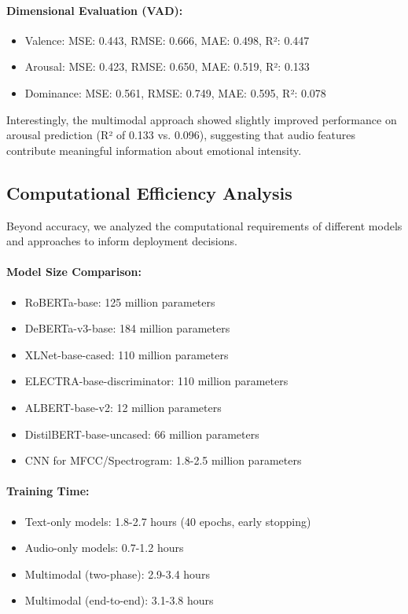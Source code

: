 \documentclass[12pt]{article}
\begin{document}
\paragraph{Dimensional Evaluation (VAD):}
\begin{itemize}
    \item Valence: MSE: 0.443, RMSE: 0.666, MAE: 0.498, R²: 0.447
    \item Arousal: MSE: 0.423, RMSE: 0.650, MAE: 0.519, R²: 0.133
    \item Dominance: MSE: 0.561, RMSE: 0.749, MAE: 0.595, R²: 0.078
\end{itemize}

Interestingly, the multimodal approach showed slightly improved performance on arousal prediction (R² of 0.133 vs. 0.096), suggesting that audio features contribute meaningful information about emotional intensity.

\subsection{Computational Efficiency Analysis}
Beyond accuracy, we analyzed the computational requirements of different models and approaches to inform deployment decisions.

\paragraph{Model Size Comparison:}
\begin{itemize}
    \item RoBERTa-base: 125 million parameters
    \item DeBERTa-v3-base: 184 million parameters
    \item XLNet-base-cased: 110 million parameters
    \item ELECTRA-base-discriminator: 110 million parameters
    \item ALBERT-base-v2: 12 million parameters
    \item DistilBERT-base-uncased: 66 million parameters
    \item CNN for MFCC/Spectrogram: 1.8-2.5 million parameters
\end{itemize}

\paragraph{Training Time:}
\begin{itemize}
    \item Text-only models: 1.8-2.7 hours (40 epochs, early stopping)
    \item Audio-only models: 0.7-1.2 hours
    \item Multimodal (two-phase): 2.9-3.4 hours
    \item Multimodal (end-to-end): 3.1-3.8 hours
\end{itemize}
\end{document}
